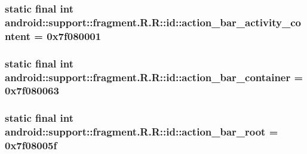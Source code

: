 \hypertarget{classandroid_1_1support_1_1fragment_1_1_r_1_1id_4ea46daf28d27d5b859f591bd828e99b}{
\subsubsection[{action\_\-bar\_\-activity\_\-content}]{\setlength{\rightskip}{0pt plus 5cm}static final int android::support::fragment.R.R::id::action\_\-bar\_\-activity\_\-content = 0x7f080001}}
\label{classandroid_1_1support_1_1fragment_1_1_r_1_1id_4ea46daf28d27d5b859f591bd828e99b}


\hypertarget{classandroid_1_1support_1_1fragment_1_1_r_1_1id_62adbb06bac6d68aa8f39b92b2103309}{
\subsubsection[{action\_\-bar\_\-container}]{\setlength{\rightskip}{0pt plus 5cm}static final int android::support::fragment.R.R::id::action\_\-bar\_\-container = 0x7f080063}}
\label{classandroid_1_1support_1_1fragment_1_1_r_1_1id_62adbb06bac6d68aa8f39b92b2103309}


\hypertarget{classandroid_1_1support_1_1fragment_1_1_r_1_1id_cf4c6df53adaebeeb60e8385a8cbfd77}{
\subsubsection[{action\_\-bar\_\-root}]{\setlength{\rightskip}{0pt plus 5cm}static final int android::support::fragment.R.R::id::action\_\-bar\_\-root = 0x7f08005f}}
\label{classandroid_1_1support_1_1fragment_1_1_r_1_1id_cf4c6df53adaebeeb60e8385a8cbfd77}


